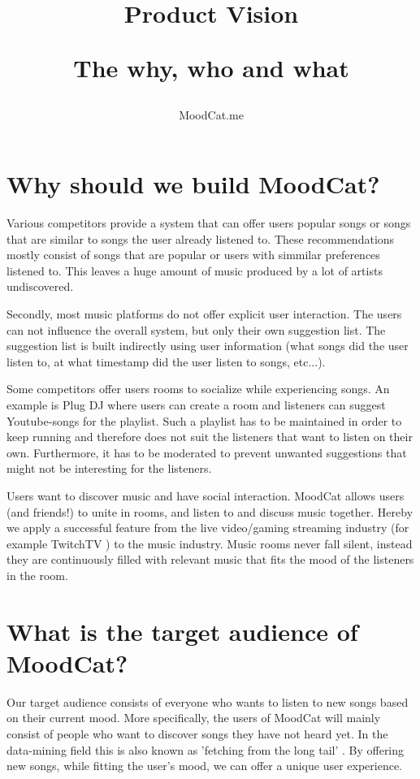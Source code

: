 \documentclass[10pt,a4paper]{article}
\begin{document}
\title{Product Vision\\
	\begin{small}
	The why, who and what
	\end{small}
}
\author{MoodCat.me}
\maketitle

\section{Why should we build MoodCat?}
Various competitors provide a system that can offer users popular songs or songs that are similar to songs the user already listened to.
These recommendations mostly consist of songs that are popular or users with simmilar preferences listened to.
This leaves a huge amount of music produced by a lot of artists undiscovered.

Secondly, most music platforms do not offer explicit user interaction.
The users can not influence the overall system, but only their own suggestion list.
The suggestion list is built indirectly using user information (what songs did the user listen to, at what timestamp did the user listen to songs, etc...).

Some competitors offer users rooms to socialize while experiencing songs.
An example is Plug DJ \cite{PlugDJ} where users can create a room and listeners can suggest Youtube-songs\cite{Youtube} for the playlist.
Such a playlist has to be maintained in order to keep running and therefore does not suit the listeners that want to listen on their own.
Furthermore, it has to be moderated to prevent unwanted suggestions that might not be interesting for the listeners.

\bigskip 

Users want to discover music and have social interaction.
MoodCat allows users (and friends!) to unite in rooms, and listen to and discuss music together.
Hereby we apply a successful feature from the live video/gaming streaming industry (for example TwitchTV \cite{Twitch}) to the music industry.
Music rooms never fall silent, instead they are continuously filled with relevant music that fits the mood of the listeners in the room.

\section{What is the target audience of MoodCat?}
Our target audience consists of everyone who wants to listen to new songs based on their current mood.
More specifically, the users of MoodCat will mainly consist of people who want to discover songs they have not heard yet.
In the data-mining field this is also known as 'fetching from the long tail' \cite{longtail}.
By offering new songs, while fitting the user's mood, we can offer a unique user experience.
\end{document}
